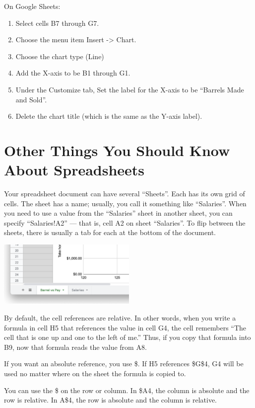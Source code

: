 On Google Sheets:

\begin{enumerate}
\item Select cells B7 through G7. 
\item Choose the menu item Insert -> Chart.
\item Choose the chart type (Line)
\item Add the X-axis to be B1 through G1.
\item Under the Customize tab, Set the label for the X-axis to be ``Barrels Made and Sold''.
\item Delete the chart title (which is the same as the Y-axis label).
\end{enumerate}

\section{Other Things You Should Know About Spreadsheets}

Your spreadsheet document can have several ``Sheets''.  Each has its
own grid of cells.  The sheet has a name; usually, you call it
something like ``Salaries''.  When you need to use a value from the
``Salaries'' sheet in another sheet, you can specify ``Salaries!A2''
--- that is, cell A2 on sheet ``Salaries''.  To flip between the sheets,
there is usually a tab for each at the bottom of the document.

\includegraphics[width=0.5\textwidth]{Sheets.png}

By default, the cell references are relative. In other words, when you write
a formula in cell H5 that references the value in cell G4, the cell
remembers ``The cell that is one up and one to the left of me.''
Thus, if you copy that formula into B9, now that formula reads the
value from A8.

If you want an absolute reference, you use \$. If H5 references
\$G\$4, G4 will be used no matter where on the sheet the formula is
copied to.

You can use the \$ on the row or column. In \$A4, the column is
absolute and the row is relative.  In A\$4, the row is absolute and
the column is relative.

